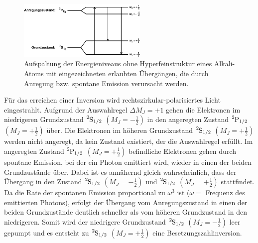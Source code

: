 \begin{figure}
	\centering
	\includegraphics[width=0.55\textwidth]{img/optischesPumpen.png}
	\caption{Aufspaltung der Energieniveaus ohne Hyperfeinstruktur eines Alkali-Atoms mit eingezeichneten erlaubten Übergängen, die durch Anregung bzw. spontane Emission verursacht werden.}
	\label{fig:optischesPumpen}
\end{figure}

Für das erreichen einer Inversion wird rechtszirkular-polarisiertes Licht eingestrahlt.
Aufgrund der Auswahlregel $\Delta M_J=+1$ gehen die Elektronen im niedrigeren Grundzustand $\ce{^{2}_{}S_{1/2}}$ $(M_J=-\frac{1}{2})$ in den angeregten Zustand $\ce{^{2}_{}P_{1/2}}$ $(M_J=+\frac{1}{2})$ über.
Die Elektronen im höheren Grundzustand $\ce{^{2}_{}S_{1/2}}$ $(M_J=+\frac{1}{2})$ werden nicht angeregt, da kein Zustand existiert, der die Auswahlregel erfüllt.
Im angeregten Zustand  $\ce{^{2}_{}P_{1/2}}$ $(M_J=+\frac{1}{2})$ befindliche Elektronen gehen durch spontane Emission, bei der ein Photon emittiert wird, wieder in einen der beiden Grundzustände über.
Dabei ist es annähernd gleich wahrscheinlich, dass der Übergang in den Zustand $\ce{^{2}_{}S_{1/2}}$
$(M_J=-\frac{1}{2})$ und $\ce{^{2}_{}S_{1/2}}$ $(M_J=+\frac{1}{2})$ stattfindet.
Da die Rate der spontanen Emission proportional zu $\omega^3$ ist ($\omega =$ Frequenz des emittierten Photons), erfolgt der Übergang vom Anregungszustand in einen der beiden Grundzustände deutlich schneller als vom höheren Grundzustand in den niedrigeren.
Somit wird der niedrigere Grundzustand $\ce{^{2}_{}S_{1/2}}$ $(M_J=-\frac{1}{2})$ leer gepumpt und es entsteht zu $\ce{^{2}_{}S_{1/2}}$ $(M_J=+\frac{1}{2})$ eine Besetzungszahlinversion.

